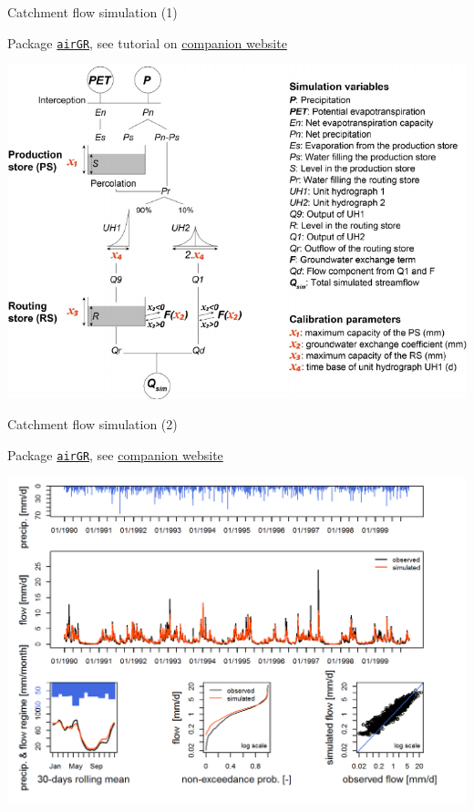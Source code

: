 \documentclass[8pt,ignorenonframetext,]{beamer}
\begin{document}
\begin{frame}[fragile]{Catchment flow simulation (1)}

Package
\href{https://cran.r-project.org/web/packages/airGR/index.html}{\texttt{airGR}},
see tutorial on
\href{https://odelaigue.github.io/airGR/index.html}{companion website}

\includegraphics{imgPres/airGR_GR4J.png}

\end{frame}

\begin{frame}[fragile]{Catchment flow simulation (2)}

Package
\href{https://cran.r-project.org/web/packages/airGR/index.html}{\texttt{airGR}},
see \href{https://odelaigue.github.io/airGR/index.html}{companion
website}

\includegraphics{imgPres/airGR.png}

\end{frame}
\end{document}

